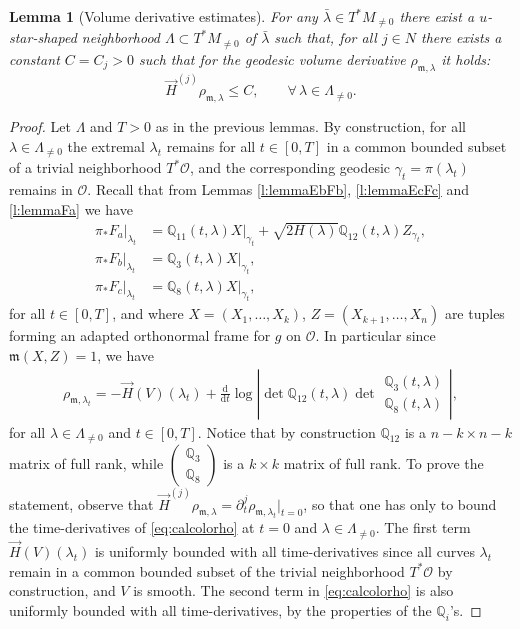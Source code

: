 \documentclass[11pt,a4paper]{article}
\theoremstyle{plain}
\newtheorem{lemma}[theorem]{Lemma}
\theoremstyle{definition}
\theoremstyle{remark}
\numberwithin{equation}{section}
\newcommand{\Q}{\mathbb{Q}}
\newcommand{\di}{\mathrm{d}}
\newcommand{\mm}{\mathfrak m}
\begin{document}
\begin{lemma}[Volume derivative estimates]\label{l:canvorder}
For any $\bar{\lambda} \in T^*M_{\neq 0}$ there exist a $u$-star-shaped neighborhood $\Lambda \subset T^*M_{\neq 0}$ of $\bar{\lambda}$ such that, for all $j\in N$ there exists a constant $C=C_j>0$ such that for the geodesic volume derivative $\rho_{\mm,\lambda}$ it holds:
\begin{equation}
\vec{H}^{(j)}\rho_{\mm,\lambda} \leq C, \qquad \forall\, \lambda \in \Lambda_{\neq 0}.
\end{equation}
\end{lemma}
\begin{proof}
Let $\Lambda$ and $T>0$ as in the previous lemmas. By construction, for all $\lambda \in \Lambda_{\neq 0}$ the extremal $\lambda_t$ remains for all $t\in [0,T]$ in a common bounded subset of a trivial neighborhood $T^*\mathcal{O}$, and the corresponding geodesic $\gamma_t = \pi(\lambda_t)$ remains in $\mathcal{O}$. Recall that from Lemmas \ref{l:lemmaEbFb}, \ref{l:lemmaEcFc} and \ref{l:lemmaFa} we have
\begin{align}
\pi_* F_a|_{\lambda_t} & = \Q_{11}(t,\lambda) X|_{\gamma_t} + \sqrt{2H(\lambda)} \Q_{12}(t,\lambda) Z_{\gamma_t}, \\
\pi_* F_b|_{\lambda_t} & = \Q_{3}(t,\lambda) X|_{\gamma_t}, \\
\pi_* F_c|_{\lambda_t} & = \Q_{8}(t,\lambda) X|_{\gamma_t},
\end{align}
for all $t\in [0,T]$, and where $X=(X_1,\dots,X_k)$, $Z=(X_{k+1},\dots,X_{n})$ are tuples forming an adapted orthonormal frame for $g$ on $\mathcal{O}$. In particular since $\mm(X,Z)=1$, we have
\begin{align}\label{eq:calcolorho}
\rho_{\mm,\lambda_t} = -\vec{H}(V)(\lambda_t) + \frac{\di}{\di t} \log \left\lvert\det \Q_{12}(t,\lambda)\det \begin{matrix} \Q_{3}(t,\lambda) \\ \Q_{8}(t,\lambda) \end{matrix}\right\rvert,
\end{align}
for all $\lambda \in \Lambda_{\neq 0}$ and $t\in[0,T]$. Notice that by construction $\mathbb{Q}_{12}$ is a $n-k\times n-k$ matrix of full rank, while $\left(\begin{smallmatrix} \Q_3 \\ \Q_8\end{smallmatrix}\right)$ is a $k\times k$ matrix of full rank. To prove the statement, observe that $\vec{H}^{(j)}\rho_{\mm,\lambda} = \partial_t^j\rho_{\mm,\lambda_t}|_{t=0}$, so that one has only to bound the time-derivatives of \eqref{eq:calcolorho} at $t=0$ and $\lambda \in \Lambda_{\neq 0}$. The first term $\vec{H}(V)(\lambda_t)$ is uniformly bounded with all time-derivatives since all curves $\lambda_t$ remain in a common bounded subset of the trivial neighborhood $T^*\mathcal{O}$ by construction, and $V$ is smooth. The second term in \eqref{eq:calcolorho} is also uniformly bounded with all time-derivatives, by the properties of the $\Q_i$'s.
\end{proof}
\end{document}
